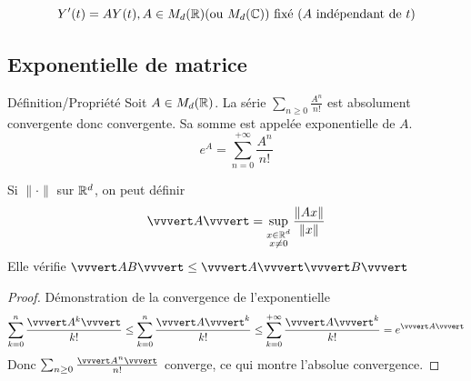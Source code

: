 \documentclass[]{report}
\begin{document}
\[Y'(t)=AY(t),A\in M_d(\mathbb{R})\text {(ou $M_d(\mathbb{C})$) fixé ($A$ indépendant de $t$)}\]

\subsection{Exponentielle de matrice}

\begin{df}{Définition/Propriété}{}
    Soit $A\in M_d(\mathbb{R})$. La série $\sum_{n\ge 0} \frac{A^n}{n!}$ est absolument convergente donc convergente. Sa somme est appelée exponentielle de $A$.
    \[e^A=\sum_{n=0}^{+\infty}\frac{A^n}{n!}\]
\end{df}

\begin{ra}{}{}
    Si $\lVert \cdot \rVert$ sur $\mathbb{R}^d$, on peut définir
    \[\vvvert A\vvvert=\sup_{\substack{x\in\R^d\\x\neq0}} \frac{\lVert Ax \rVert}{\lVert x \rVert}\]
    Elle vérifie $\vvvert AB \vvvert\le \vvvert A \vvvert \vvvert B \vvvert$
\end{ra}

\begin{proof}{Démonstration de la convergence de l'exponentielle}{}
    \[\sum_{k=0}^n\frac{\vvvert A^k \vvvert}{k!}\le \sum_{k=0}^n\frac{\vvvert A\vvvert^k }{k!} \le \sum_{k=0}^{+\infty}\frac{\vvvert A\vvvert^k }{k!}=e^{\vvvert A\vvvert}\]
    Donc $\sum_{n\ge0}\frac{\vvvert A^n\vvvert}{n!}$ converge, ce qui montre l'absolue convergence.
\end{proof}
\end{document}
